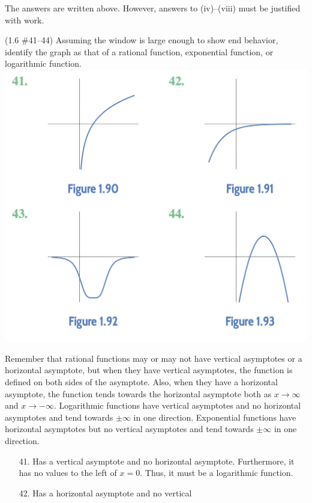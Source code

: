 \documentclass[11pt]{exam}
\begin{document}
\begin{questions}
\begin{solution}
  The answers are written above. However, answers to (iv)--(viii) must be
  justified with work.
\end{solution}
\question (1.6 \#41--44) Assuming the window is large enough to show
end behavior, identify the graph as that of a rational function,
exponential function, or logarithmic function.\\
\includegraphics[scale=0.5]{probs41-44.png}
\begin{solution}
  Remember that rational functions may or may not have vertical
  asymptotes or a horizontal asymptote, but when they have vertical
  asymptotes, the function is defined on both sides of the asymptote. Also, when they
  have a horizontal asymptote, the function tends towards the
  horizontal asymptote both as \(x\to\infty\) and \(x\to-\infty\). Logarithmic
  functions have vertical asymptotes and no horizontal
  asymptotes and tend towards \(\pm\infty\) in one direction. Exponential functions have horizontal asymptotes but no
  vertical asymptotes and tend towards \(\pm\infty\) in one direction.
  \begin{enumerate}
  \item[41.]  Has a vertical asymptote and no horizontal
    asymptote. Furthermore, it has no values to the left of
    \(x=0\). Thus, it must be a logarithmic function.
  \item[42.]  Has a horizontal asymptote and no vertical

\end{enumerate}
\end{solution}
\end{questions}
\end{document}
